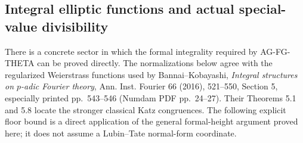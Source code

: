 \documentclass[11pt,a4paper]{article}
\begin{document}
\subsection{Integral elliptic functions and actual special-value divisibility}
\label{ag:elliptic-integrality}

There is a concrete sector in which the formal integrality required
by AG-FG-THETA can be proved directly. The normalizations below agree
with the regularized Weierstrass functions used by Bannai--Kobayashi,
\emph{Integral structures on $p$-adic Fourier theory}, Ann. Inst.
Fourier 66 (2016), 521--550, Section 5, especially printed pp.~543--546
(Numdam PDF pp.~24--27). Their Theorems 5.1 and 5.8 locate the stronger
classical Katz congruences. The following explicit floor bound is a
direct application of the general formal-height argument proved here;
it does not assume a Lubin--Tate normal-form coordinate.
\end{document}
